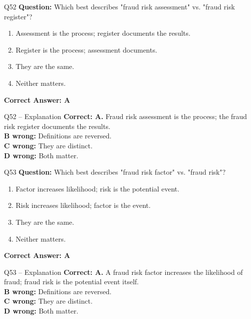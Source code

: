 \documentclass[aspectratio=169,10pt]{beamer}
\begin{document}
	\begin{frame}[t]{Q52}
		\small
		\textbf{Question:} Which best describes "fraud risk assessment" vs. "fraud risk register"?
		\begin{enumerate}[label=\Alph*.,itemsep=1pt,topsep=2pt]
			\item Assessment is the process; register documents the results.
			\item Register is the process; assessment documents.
			\item They are the same.
			\item Neither matters.
		\end{enumerate}
		\vspace{4pt}
		\textbf{Correct Answer: A}
	\end{frame}
	
	\begin{frame}[t]{Q52 -- Explanation}
		\small
		\textbf{Correct: A.} Fraud risk assessment is the process; the fraud risk register documents the results. \\[4pt]
		\textbf{B wrong:} Definitions are reversed. \\[2pt]
		\textbf{C wrong:} They are distinct. \\[2pt]
		\textbf{D wrong:} Both matter.
	\end{frame}
	
	\begin{frame}[t]{Q53}
		\small
		\textbf{Question:} Which best describes "fraud risk factor" vs. "fraud risk"?
		\begin{enumerate}[label=\Alph*.,itemsep=1pt,topsep=2pt]
			\item Factor increases likelihood; risk is the potential event.
			\item Risk increases likelihood; factor is the event.
			\item They are the same.
			\item Neither matters.
		\end{enumerate}
		\vspace{4pt}
		\textbf{Correct Answer: A}
	\end{frame}
	
	\begin{frame}[t]{Q53 -- Explanation}
		\small
		\textbf{Correct: A.} A fraud risk factor increases the likelihood of fraud; fraud risk is the potential event itself. \\[4pt]
		\textbf{B wrong:} Definitions are reversed. \\[2pt]
		\textbf{C wrong:} They are distinct. \\[2pt]
		\textbf{D wrong:} Both matter.
	\end{frame}
	
\end{document}
